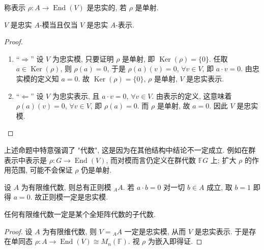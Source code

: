 \begin{definition}[忠实表示]\label{def:faithful-rep}
称表示 $\rho\colon A\to\operatorname{End}(V)$ 是忠实的, 若 $\rho$ 是单射.
\end{definition}

\begin{proposition}\label{prop:faithful-equiv}
$V$ 是忠实 $A$-模当且仅当 $V$ 是忠实 $A$-表示.
\end{proposition}

\begin{proof}
\mbox{}\par\vspace{-0.2em}
\begin{enumerate}
\item ``$\Longrightarrow$'' 设 $V$ 为忠实模, 只要证明 $\rho$ 是单射, 即 $\operatorname{Ker}(\rho)=\{0\}$.
任取 $a\in\operatorname{Ker}(\rho)$, 则 $\rho(a)=0$, 于是 $\rho(a)(v)=0$, $\forall v\in V$,
即 $a\cdot v=0$. 由忠实模的定义知 $a=0$. 故 $\operatorname{Ker}(\rho)=\{0\}$, $\rho$ 是单射,
$V$ 是忠实表示.

\item ``$\Longleftarrow$'' 设 $V$ 为忠实表示, 且 $a\cdot v=0$, $\forall v\in V$. 由表示的定义, 这意味着
$\rho(a)(v)=0$, $\forall v\in V$, 即 $\rho(a)=0$. 而 $\rho$ 是单射, 故 $a=0$. 因此 $V$ 是忠实模.
\end{enumerate}
\end{proof}

\begin{remark}\label{rem:faithful-algebra-only}
上述命题中特意强调了 "代数", 这是因为在其他结构中结论不一定成立.
例如在群表示中表示是 $\rho\colon G\to\operatorname{End}(V)$, 而对模而言仍定义在群代数 $\mathbb{F}G$ 上;
扩大 $\rho$ 的作用范围, 可能不会保证 $\rho$ 仍是单射.
\end{remark}

\begin{example}\label{ex:regular-module-faithful}
设 $A$ 为有限维代数, 则总有正则模 ${}_AA$. 若 $a\cdot b=0$ 对一切 $b\in A$ 成立,
取 $b=1$ 即得 $a=0$. 故正则模一定是忠实模.
\end{example}

\begin{theorem}\label{thm:algebra-embeds-in-matrix}
任何有限维代数一定是某个全矩阵代数的子代数.
\end{theorem}

\begin{proof}
设 $A$ 为有限维代数, 则 $V={}_AA$ 一定是忠实模, 从而 $V$ 是忠实表示.
于是存在单同态 $\rho\colon A\to\operatorname{End}(V)\cong M_n(\mathbb{F})$. 视 $\rho$ 为嵌入即得证.
\end{proof}
